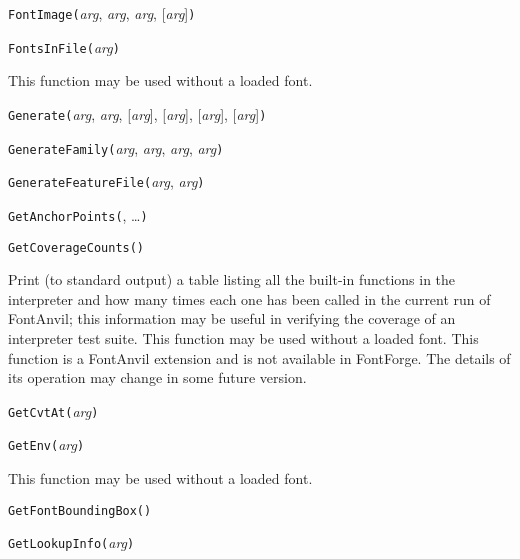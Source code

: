 \noindent\texttt{FontImage(}\textit{arg}, \textit{arg}, \textit{arg}, [\textit{arg}]\texttt{)}


\noindent\texttt{FontsInFile(}\textit{arg}\texttt{)}

This function may be used without a loaded font.


\noindent\texttt{Generate(}\textit{arg}, \textit{arg}, [\textit{arg}], [\textit{arg}], [\textit{arg}], [\textit{arg}]\texttt{)}


\noindent\texttt{GenerateFamily(}\textit{arg}, \textit{arg}, \textit{arg}, \textit{arg}\texttt{)}


\noindent\texttt{GenerateFeatureFile(}\textit{arg}, \textit{arg}\texttt{)}


\noindent\texttt{GetAnchorPoints(}, \ldots\texttt{)}


\noindent\texttt{GetCoverageCounts()}

Print (to standard output) a table listing all the built-in functions in the
interpreter and how many times each one has been called in the current run
of FontAnvil; this information may be useful in verifying the coverage of an
interpreter test suite.
This function may be used without a loaded font.  This \FFdiff function is a
FontAnvil extension and is not available in FontForge.  The details of its
operation may change in some future version.


\noindent\texttt{GetCvtAt(}\textit{arg}\texttt{)}


\noindent\texttt{GetEnv(}\textit{arg}\texttt{)}

This function may be used without a loaded font.


\noindent\texttt{GetFontBoundingBox(}\texttt{)}


\noindent\texttt{GetLookupInfo(}\textit{arg}\texttt{)}


